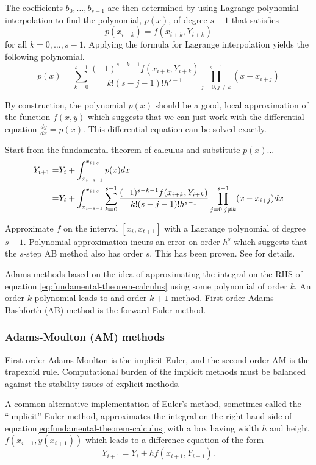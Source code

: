\documentclass[11pt]{article}
\begin{document}
The coefficients $b_0,\dots,b_{s-1}$ are then determined by using Lagrange polynomial interpolation to find the polynomial, $p(x)$, of degree $s-1$ that satisfies 
\begin{equation}
	p(x_{i+k}) = f(x_{i+k}, Y_{i+k})
\end{equation}
for all $k=0, \dots, s-1$. Applying the formula for Lagrange interpolation yields the following polynomial. 
\begin{equation}
	p(x) = \sum_{k=0}^{s-1}\frac{(-1)^{s-k-1}f(x_{i+k}, Y_{i+k})}{k!(s-j-1)!h^{s-1}}\prod_{j=0,j\neq k}^{s-1} (x -x_{i+j})
\end{equation}
 
By construction, the polynomial $p(x)$ should be a good, local approximation of the function $f(x, y)$ which suggests that we can just work with the differential equation $\frac{dy}{dx} = p(x)$.  This differential equation can be solved exactly.   

Start from the fundamental theorem of calculus and substitute $p(x)$...
\begin{align}
	Y_{i+1} =& Y_i + \int_{x_{i+s-1}}^{x_{i+s}} p(x)dx \notag \\
	=& Y_i + \int_{x_{i+s-1}}^{x_{i+s}} \sum_{k=0}^{s-1}\frac{(-1)^{s-k-1}f(x_{i+k}, Y_{i+k})}{k!(s-j-1)!h^{s-1}}\prod_{j=0,j\neq k}^{s-1} (x -x_{i+j})dx 
\end{align}

Approximate $f$ on the interval $[x_i, x_{t+1}]$ with a Lagrange polynomial of degree $s-1$.  Polynomial approximation incurs an error on order $h^s$ which suggests that the $s$-step AB method also has order $s$.  This has been proven.  See \cite{iserles2009first} for details.  
 
Adams methods based on the idea of approximating the integral on the RHS of equation \ref{eq:fundamental-theorem-calculus} using some polynomial of order $k$.  An order $k$ polynomial leads to and order $k+1$ method.  First order Adams-Bashforth (AB) method is the forward-Euler method. 

\subsubsection{Adams-Moulton (AM) methods}
 First-order Adams-Moulton is the implicit Euler, and the second order AM is the trapezoid rule.  Computational burden of the implicit methods must be balanced against the stability issues of explicit methods.

A common alternative implementation of Euler's method, sometimes called the ``implicit'' Euler method, approximates the integral on the right-hand side of equation\ref{eq:fundamental-theorem-calculus} with a box having width $h$ and height $f(x_{i+1}, y(x_{i+1}))$ which leads to a difference equation of the form
\begin{equation}\label{eq:implicit-euler-method}
	Y_{i+1} = Y_i + hf(x_{i+1}, Y_{i+1}).
\end{equation}
\end{document}
